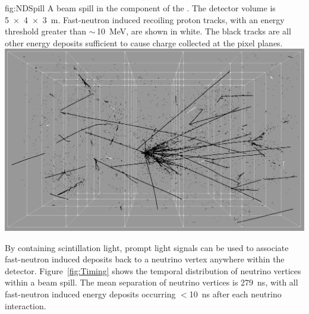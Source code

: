 \begin{dunefigure}{fig:NDSpill}
{A beam spill in the  component of the  . 
		The detector volume is \SI[product-units=repeat]{5x4x3}{\metre}.
		Fast-neutron induced recoiling proton tracks, with an energy threshold greater than $\sim\,$\SI{10}{\mega\electronvolt}, are shown in white.
		The black tracks are all other energy deposits sufficient to cause charge collected at the pixel planes.}
\includegraphics[width=.7\textwidth]{graphics/NeutronNDSpill.png}
\end{dunefigure}

By containing scintillation light, prompt light signals can be used to associate fast-neutron induced deposits back to a neutrino vertex anywhere within the detector.
Figure~\ref{fig:Timing} shows the temporal distribution of neutrino vertices within a beam spill.
The mean separation of neutrino vertices is \SI{279}{\nano\second}, with all fast-neutron induced energy deposits occurring $<$\SI{10}{\nano\second} after each neutrino interaction.      


